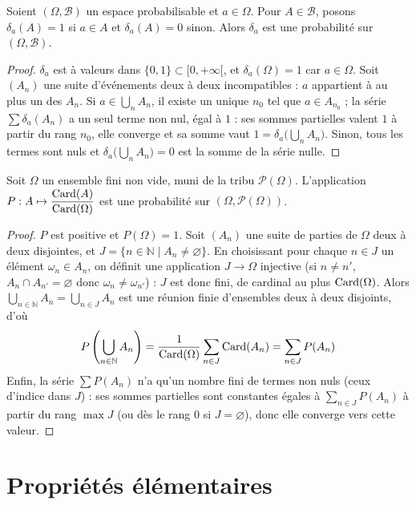 \begin{exemple}
Soient $(\Omega,\mathcal{B})$ un espace probabilisable et $a\in\Omega$. Pour $A\in\mathcal{B}$, posons $\delta_a(A)=1$ si $a\in A$ et $\delta_a(A)=0$ sinon. Alors $\delta_a$ est une probabilité sur $(\Omega,\mathcal{B})$.
\end{exemple}

\begin{proof}
$\delta_a$ est à valeurs dans $\{0,1\}\subset[0,+\infty[$, et $\delta_a(\Omega)=1$ car $a\in\Omega$. Soit $(A_n)$ une suite d'événements deux à deux incompatibles : $a$ appartient à au plus un des $A_n$. Si $a\in\bigcup_nA_n$, il existe un unique $n_0$ tel que $a\in A_{n_0}$ ; la série $\sum\delta_a(A_n)$ a un seul terme non nul, égal à $1$ : ses sommes partielles valent $1$ à partir du rang $n_0$, elle converge et sa somme vaut $1=\delta_a\big(\bigcup_nA_n\big)$. Sinon, tous les termes sont nuls et $\delta_a\big(\bigcup_nA_n\big)=0$ est la somme de la série nulle.
\end{proof}

\begin{exemple}
Soit $\Omega$ un ensemble fini non vide, muni de la tribu $\mathcal{P}(\Omega)$. L'application $P:A\mapsto\dfrac{\operatorname{Card}(A)}{\operatorname{Card}(\Omega)}$ est une probabilité sur $(\Omega,\mathcal{P}(\Omega))$.
\end{exemple}

\begin{proof}
$P$ est positive et $P(\Omega)=1$. Soit $(A_n)$ une suite de parties de $\Omega$ deux à deux disjointes, et $J=\{n\in\mathbb{N}\mid A_n\neq\varnothing\}$. En choisissant pour chaque $n\in J$ un élément $\omega_n\in A_n$, on définit une application $J\to\Omega$ injective (si $n\neq n'$, $A_n\cap A_{n'}=\varnothing$ donc $\omega_n\neq\omega_{n'}$) : $J$ est donc fini, de cardinal au plus $\operatorname{Card}(\Omega)$. Alors $\bigcup_{n\in\mathbb{N}}A_n=\bigcup_{n\in J}A_n$ est une réunion finie d'ensembles deux à deux disjoints, d'où
\[P\left(\bigcup_{n\in\mathbb{N}}A_n\right)=\frac{1}{\operatorname{Card}(\Omega)}\sum_{n\in J}\operatorname{Card}(A_n)=\sum_{n\in J}P(A_n)\]
Enfin, la série $\sum P(A_n)$ n'a qu'un nombre fini de termes non nuls (ceux d'indice dans $J$) : ses sommes partielles sont constantes égales à $\sum_{n\in J}P(A_n)$ à partir du rang $\max J$ (ou dès le rang $0$ si $J=\varnothing$), donc elle converge vers cette valeur.
\end{proof}

\section{Propriétés élémentaires}

